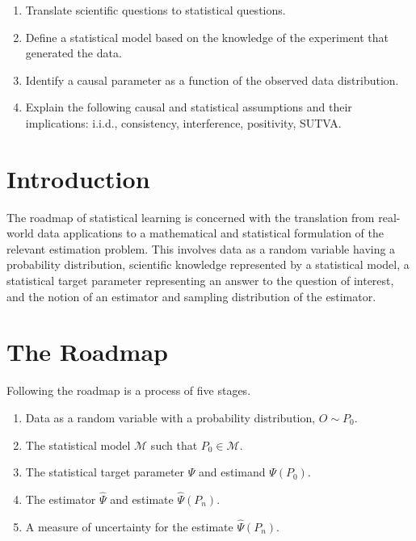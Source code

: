 \documentclass[12pt, krantz2,]{krantz}
\providecommand{\tightlist}{%
  \setlength{\itemsep}{0pt}\setlength{\parskip}{0pt}}
\theoremstyle{definition}
\theoremstyle{definition}
\theoremstyle{definition}
\newcommand{\M}{\mathcal{M}}
\newcommand{\1}{\mathbbm{1}}
\begin{document}
\begin{enumerate}
\def\labelenumi{\arabic{enumi}.}
\tightlist
\item
  Translate scientific questions to statistical questions.
\item
  Define a statistical model based on the knowledge of the experiment that
  generated the data.
\item
  Identify a causal parameter as a function of the observed data distribution.
\item
  Explain the following causal and statistical assumptions and their
  implications: i.i.d., consistency, interference, positivity, SUTVA.
\end{enumerate}

\hypertarget{introduction}{%
\section*{Introduction}\label{introduction}}


The roadmap of statistical learning is concerned with the translation from
real-world data applications to a mathematical and statistical formulation of
the relevant estimation problem. This involves data as a random variable having
a probability distribution, scientific knowledge represented by a statistical
model, a statistical target parameter representing an answer to the question of
interest, and the notion of an estimator and sampling distribution of the
estimator.

\hypertarget{roadmap}{%
\section{The Roadmap}\label{roadmap}}

Following the roadmap is a process of five stages.

\begin{enumerate}
\def\labelenumi{\arabic{enumi}.}
\tightlist
\item
  Data as a random variable with a probability distribution, \(O \sim P_0\).
\item
  The statistical model \(\M\) such that \(P_0 \in \M\).
\item
  The statistical target parameter \(\Psi\) and estimand \(\Psi(P_0)\).
\item
  The estimator \(\hat{\Psi}\) and estimate \(\hat{\Psi}(P_n)\).
\item
  A measure of uncertainty for the estimate \(\hat{\Psi}(P_n)\).
\end{enumerate}
\end{document}

